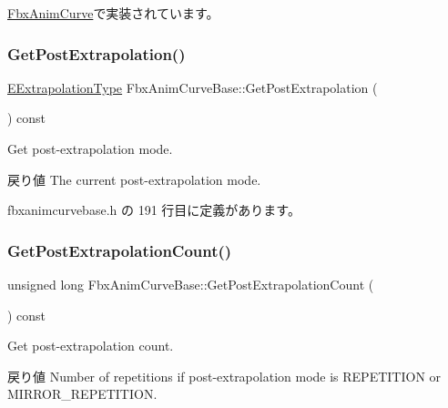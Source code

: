 \hyperlink{class_fbx_anim_curve_a8982eaf744608ac38457fd6f87990044}{Fbx\+Anim\+Curve}で実装されています。

\mbox{\label{class_fbx_anim_curve_base_acabeaab2cff8753d0411eb0b4e268dc5}} 
\subsubsection{\texorpdfstring{Get\+Post\+Extrapolation()}{GetPostExtrapolation()}}
{\footnotesize\ttfamily \hyperlink{class_fbx_anim_curve_base_aa7214d43daa7b6b9b47a8118a858847f}{E\+Extrapolation\+Type} Fbx\+Anim\+Curve\+Base\+::\+Get\+Post\+Extrapolation (\begin{DoxyParamCaption}{ }\end{DoxyParamCaption}) const\hspace{0.3cm}{\ttfamily [inline]}}

Get post-\/extrapolation mode. \begin{DoxyReturn}{戻り値}
The current post-\/extrapolation mode. 
\end{DoxyReturn}


 fbxanimcurvebase.\+h の 191 行目に定義があります。

\mbox{\label{class_fbx_anim_curve_base_a2ccd05e435a7f010759c947815c55475}} 
\subsubsection{\texorpdfstring{Get\+Post\+Extrapolation\+Count()}{GetPostExtrapolationCount()}}
{\footnotesize\ttfamily unsigned long Fbx\+Anim\+Curve\+Base\+::\+Get\+Post\+Extrapolation\+Count (\begin{DoxyParamCaption}{ }\end{DoxyParamCaption}) const\hspace{0.3cm}{\ttfamily [inline]}}

Get post-\/extrapolation count. \begin{DoxyReturn}{戻り値}
Number of repetitions if post-\/extrapolation mode is R\+E\+P\+E\+T\+I\+T\+I\+ON or M\+I\+R\+R\+O\+R\+\_\+\+R\+E\+P\+E\+T\+I\+T\+I\+ON. 
\end{DoxyReturn}


